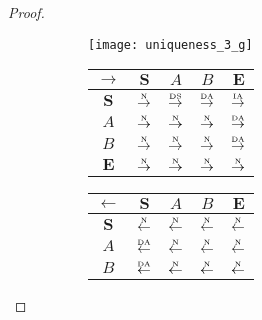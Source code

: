 \begin{proof}
\begin{figure}[htbp]
  \begin{subfigure}{1\textwidth}
    \vspace{1em}
    \centering
    \begin{minipage}[b]{1\textwidth}
      \centering
      \texttt{[image: uniqueness\_3\_g]}
    \end{minipage}
    \begin{minipage}[b]{0.3\textwidth}
      \vspace{1em}
      \centering
      \begin{tabular}{|c|c|c|c|c|} \hline
        $\rightarrow$ & $\bm{S}$ & $A$ & $B$ & $\bm{E}$\\ \hline
        $\bm{S}$ & $\overset{\text{\tiny{N}}}{\rightarrow}$ & $\overset{\text{\tiny{DS}}}{\rightarrow}$ & $\overset{\text{\tiny{DA}}}{\rightarrow}$ & $\overset{\text{\tiny{IA}}}{\rightarrow}$\\ \hline
        $A$ & $\overset{\text{\tiny{N}}}{\rightarrow}$ & $\overset{\text{\tiny{N}}}{\rightarrow}$ & $\overset{\text{\tiny{N}}}{\rightarrow}$ & $\overset{\text{\tiny{DA}}}{\rightarrow}$\\ \hline
        $B$ & $\overset{\text{\tiny{N}}}{\rightarrow}$ & $\overset{\text{\tiny{N}}}{\rightarrow}$ & $\overset{\text{\tiny{N}}}{\rightarrow}$ & $\overset{\text{\tiny{DA}}}{\rightarrow}$\\ \hline
        $\bm{E}$ & $\overset{\text{\tiny{N}}}{\rightarrow}$ & $\overset{\text{\tiny{N}}}{\rightarrow}$ & $\overset{\text{\tiny{N}}}{\rightarrow}$ & $\overset{\text{\tiny{N}}}{\rightarrow}$\\ \hline
      \end{tabular}
    \end{minipage}
    \begin{minipage}[b]{0.3\textwidth}
      \vspace{1em}
      \centering
      \begin{tabular}{|c|c|c|c|c|} \hline
        $\leftarrow$ & $\bm{S}$ & $A$ & $B$ & $\bm{E}$\\ \hline
        $\bm{S}$ & $\overset{\text{\tiny{N}}}{\leftarrow}$ & $\overset{\text{\tiny{N}}}{\leftarrow}$ & $\overset{\text{\tiny{N}}}{\leftarrow}$ & $\overset{\text{\tiny{N}}}{\leftarrow}$\\ \hline
        $A$ & $\overset{\text{\tiny{DA}}}{\leftarrow}$ & $\overset{\text{\tiny{N}}}{\leftarrow}$ & $\overset{\text{\tiny{N}}}{\leftarrow}$ & $\overset{\text{\tiny{N}}}{\leftarrow}$\\ \hline
        $B$ & $\overset{\text{\tiny{DA}}}{\leftarrow}$ & $\overset{\text{\tiny{N}}}{\leftarrow}$ & $\overset{\text{\tiny{N}}}{\leftarrow}$ & $\overset{\text{\tiny{N}}}{\leftarrow}$\\ \hline

\end{tabular}
\end{minipage}
\end{subfigure}
\end{figure}
\end{proof}
